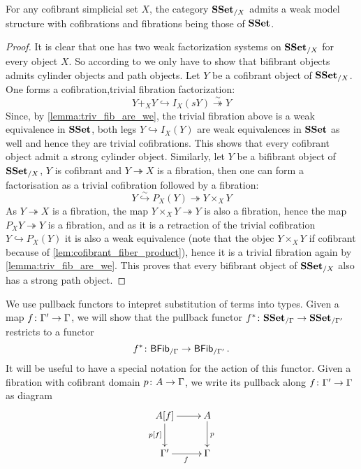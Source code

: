 \documentclass[reqno,10pt,a4paper,oneside,draft]{amsart}
\begin{document}
\begin{proposition}
For any cofibrant simplicial set $X$, the category $\mathbf{SSet}_{/X}$ admits a weak model structure with cofibrations and fibrations  being those of $\mathbf{SSet}$.
\end{proposition}

\begin{proof}

It is clear that one has two weak factorization systems on $\mathbf{SSet}_{/X}$ for every object $X$. So according to \cite[Definition~2.1.11]{henry2018wms} we only have to show that bifibrant objects admits cylinder objects and path objects. Let $Y$ be a cofibrant object of $\mathbf{SSet}_{/X}$. One forms a cofibration,trivial fibration factorization:
\[ 
Y +_X Y \hookrightarrow I_X(sY) \overset{\sim}{\twoheadrightarrow} Y 
\]
Since, by  \cref{lemma:triv_fib_are_we}, the trivial fibration above is a weak equivalence in $\mathbf{SSet}$, both legs $Y \hookrightarrow I_X(Y)$ are weak equivalences in $\mathbf{SSet}$ as well and hence they are trivial cofibrations. This shows that every cofibrant object admit a strong cylinder object. Similarly, let $Y$ be a bifibrant object of $\mathbf{SSet}_{/X}$, \ie $Y$ is cofibrant and $Y \twoheadrightarrow X$ is a fibration, then one can form a factorisation as a trivial cofibration followed by a fibration:
\[ 
Y \overset{\sim}{\hookrightarrow} P_X(Y) {\twoheadrightarrow} Y \times_{X} Y 
\]
As $Y \twoheadrightarrow X$ is a fibration, the map $Y \times_X Y \twoheadrightarrow Y$ is also a fibration, hence the map $P_X Y \twoheadrightarrow Y$ is a fibration, and as it is a retraction of the trivial cofibration $Y \hookrightarrow P_X(Y)$ it is also a weak equivalence (note that the objec $Y \times_X Y$ if cofibrant because of \cref{lem:cofibrant_fiber_product}), hence it is a trivial fibration again by \cref{lemma:triv_fib_are_we}. This proves that every bifibrant object of $\mathbf{SSet}_{/X}$ also has a strong path object.
\end{proof}




We use pullback functors to intepret substitution of terms into types. Given a map $f \colon \Gamma' \to \Gamma$, we will show that the pullback functor $f^* \colon \mathbf{SSet}_{/\Gamma} \to \mathbf{SSet}_{/\Gamma'}$ restricts to a functor
\[
f^* \colon \mathsf{BFib}_{/\Gamma}  \to \mathsf{BFib}_{/\Gamma'} \, .
\]
It will be useful to have a special notation for the action of this functor. Given a fibration with cofibrant
domain $p \colon A \to \Gamma$, we write its pullback along $f \colon \Gamma' \to \Gamma$ as diagram
\[
\xymatrix{
A[f] \ar[r] \ar[d]_{p[f]} & A \ar[d]^p \\
\Gamma' \ar[r]_f & \Gamma }
\]
\end{document}
